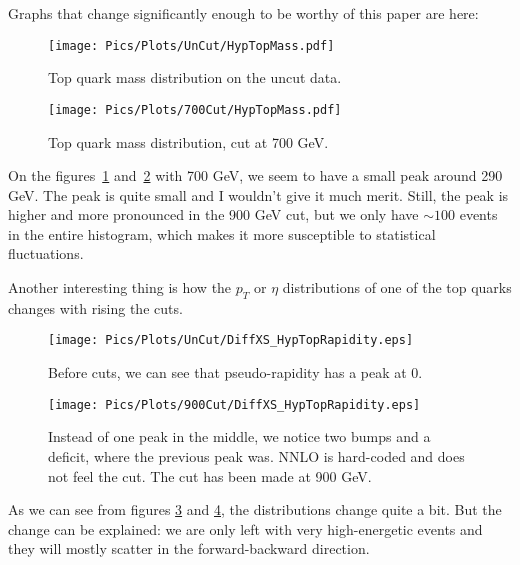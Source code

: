 \documentclass[a4paper, 12 pt, titlepage, twocolumn]{article}
\begin{document}
Graphs that change significantly enough to be worthy of this paper are here:

\begin{figure}[H]
	\centering
	\texttt{[image: Pics/Plots/UnCut/HypTopMass.pdf]}
	\vspace{-12pt}
	\caption{Top quark mass distribution on the uncut data.}
	\label{fig:topmassuncut}
\end{figure}

\begin{figure}[H]
	\centering
	\texttt{[image: Pics/Plots/700Cut/HypTopMass.pdf]}
	\vspace{-12pt}
	\caption{Top quark mass distribution, cut at 700 GeV.}
	\label{fig:topmass700cut}
\end{figure}

On the figures~\ref{fig:topmassuncut} and~\ref{fig:topmass700cut} with 700 GeV, we seem to have a small peak
around 290 GeV. The peak is quite small and I wouldn't give it much merit. Still, the peak is higher and
more pronounced in the 900 GeV cut, but we only have $\sim 100$ events in the entire histogram, which makes
it more susceptible to statistical fluctuations.

Another interesting thing is how the $p_T$ or $\eta$ distributions of one of the top quarks changes with
rising the cuts.

\begin{figure}[H]
	\centering
	\texttt{[image: Pics/Plots/UnCut/DiffXS\_HypTopRapidity.eps]}
	\vspace{-12pt}
	\caption{Before cuts, we can see that pseudo-rapidity has a peak at 0.}
	\label{fig:toprapuncut}
	\vspace{-18pt}
\end{figure}

\begin{figure}[H]
	\centering
	\texttt{[image: Pics/Plots/900Cut/DiffXS\_HypTopRapidity.eps]}
	\vspace{-12pt}
	\caption{Instead of one peak in the middle, we notice two bumps and a deficit, where the previous peak
		was. NNLO is hard-coded and does not feel the cut. The cut has been made at 900 GeV.}
	\label{fig:toprap900cut}
	\vspace{-12pt}
\end{figure}

As we can see from figures \ref{fig:toprapuncut} and \ref{fig:toprap900cut}, the distributions change quite a
bit. But the change can be explained: we are only left with very high-energetic events and they will mostly
scatter in the forward-backward direction.
\end{document}
